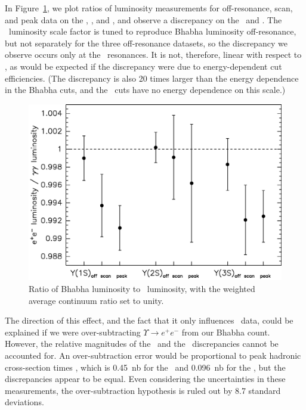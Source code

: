 \documentclass{cornell}
\begin{document}
\label{sec:luminosityconsistency}
In Figure~\ref{lumigamgam}, we plot ratios of luminosity measurements
for off-resonance, scan, and peak data on the \us, \uss, and \usss,
and observe a discrepancy on the \us\ and \usss.  The \gamgam\
luminosity scale factor is tuned to reproduce Bhabha luminosity
off-resonance, but not separately for the three off-resonance
datasets, so the discrepancy we observe occurs only at the \ups\
resonances.  It is not, therefore, linear with respect to \ecm, as
would be expected if the discrepancy were due to energy-dependent cut
efficiencies.  (The discrepancy is also 20 times larger than the
energy dependence in the Bhabha cuts, and the \gamgam\ cuts have no
energy dependence on this scale.)

\begin{figure}[p]
  \begin{center}
    \includegraphics[width=\linewidth]{lumigamgam}
  \end{center}
  \caption[Ratio of Bhabha luminosity to \gamgam\ luminosity through
  each resonance]{\label{lumigamgam} Ratio of Bhabha luminosity to
  \gamgam\ luminosity, with the weighted average continuum ratio set
  to unity.}
\end{figure}

The direction of this effect, and the fact that it only influences
\ups\ data, could be explained if we were over-subtracting $\Upsilon
\to e^+e^-$ from our Bhabha count.  However, the relative magnitudes
of the \us\ and the \usss\ discrepancies cannot be accounted for.  An
over-subtraction error would be proportional to peak hadronic
cross-section times \bee, which is 0.45~nb for the \us\ and 0.096~nb
for the \usss, but the discrepancies appear to be equal.  Even
considering the uncertainties in these measurements, the
over-subtraction hypothesis is ruled out by 8.7 standard deviations.
\end{document}
